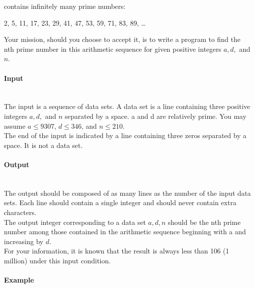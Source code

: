 \documentclass{article}
\begin{document}
contains infinitely many prime numbers:

\begin{center}
2, 5, 11, 17, 23, 29, 41, 47, 53, 59, 71, 83, 89, …
\end{center}
Your mission, should you choose to accept it, is to write a program to find the nth prime number in this arithmetic sequence for given positive integers $a, d,$ and $n$.

\paragraph{Input} \mbox{} \\

The input is a sequence of data sets. A data set is a line containing three positive integers $a, d,$ and $n$ separated by a space. a and d are relatively prime. You may assume $a \leq 9307$, $d \leq 346$, and $n \leq 210$. \\
The end of the input is indicated by a line containing three zeros separated by a space. It is not a data set.

\paragraph{Output}\mbox{} \\

The output should be composed of as many lines as the number of the input data sets. Each line should contain a single integer and should never contain extra characters. \\

The output integer corresponding to a data set $a, d, n$ should be the nth prime number among those contained in the arithmetic sequence beginning with a and increasing by $d$. \\

For your information, it is known that the result is always less than 106 (1 million) under this input condition.


\paragraph{Example}\mbox{} \\
\end{document}
